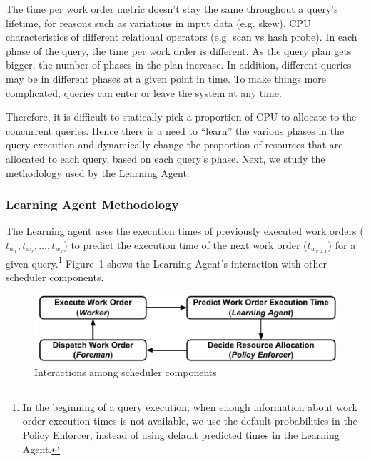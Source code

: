The time per work order metric doesn't stay the same throughout a query's lifetime, for reasons such as variations in input data (e.g. skew), CPU characteristics of different relational operators (e.g. scan vs hash probe).
In each phase of the query, the time per work order is different.
As the query plan gets bigger, the number of phases in the plan increase.
In addition, different queries may be in different phases at a given point in time.
To make things more complicated, queries can enter or leave the system at any time.

Therefore, it is difficult to statically pick a proportion of CPU to allocate to the concurrent queries. 
Hence there is a need to ``learn'' the various phases in the query execution and dynamically change the proportion of resources that are allocated to each query, based on each query's phase.
Next, we study the methodology used by the Learning Agent.
\subsubsection{Learning Agent Methodology}
The Learning agent uses the execution times of previously executed work orders 
($t_{w_{1}}, t_{w_{2}}, \ldots, t_{w_{k}}$) to predict the execution time of 
the next work order ($t_{w_{k+1}}$) for a given query.\footnote{In the beginning of a query execution, when enough information about work order execution times is not available, we use the default probabilities in the Policy Enforcer, instead of using default predicted times in the Learning Agent.}
Figure~\ref{fig:scheduler-cycle} shows the Learning Agent's interaction with other scheduler components.

\begin{figure}[]
	\centering
	\includegraphics[width=\linewidth]{policy/figures/Compact-SchedulerCycle.pdf}
	\vspace{-1.5em}
	\caption{Interactions among scheduler components}
	\label{fig:scheduler-cycle}
	\vspace{-1.5em}
\end{figure}

